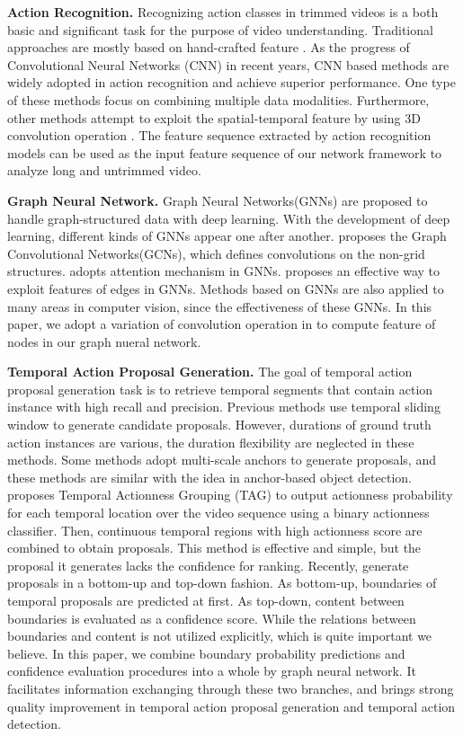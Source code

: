 \documentclass[runningheads]{llncs}
\begin{document}
\noindent\textbf{Action Recognition.}
Recognizing action classes in trimmed videos is a both basic and significant task for the purpose of video understanding. Traditional approaches are mostly based on hand-crafted feature \cite{one,two,three,four}. As the progress of Convolutional Neural Networks (CNN) in recent years, CNN based methods are widely adopted in action recognition and achieve superior performance. One type of these methods \cite{five,six} focus on combining multiple data modalities. Furthermore, other methods attempt to exploit the spatial-temporal feature by using 3D convolution operation \cite{eight,nine,ten}. The feature sequence extracted by action recognition models can be used as the input feature sequence of our network framework to analyze long and untrimmed video.

\noindent\textbf{Graph Neural Network.} Graph Neural Networks(GNNs) are proposed to handle graph-structured data with deep learning. With the development of deep learning, different kinds of GNNs appear one after another. \cite{Kipf_GCN} proposes the Graph Convolutional Networks(GCNs), which defines convolutions on the non-grid structures. \cite{GAT} adopts attention mechanism in GNNs. \cite{EGGN} proposes an effective way to exploit features of edges in GNNs.  Methods\cite{visual_GNNs_1,visual_GNNs_2,visual_GNNs_3} based on GNNs are also applied to many areas in computer vision, since the effectiveness of these GNNs. In this paper, we adopt a variation of convolution operation in \cite{EGGN} to compute feature of nodes in our graph nueral network.

\noindent\textbf{Temporal Action Proposal Generation.}
The goal of temporal action proposal generation task is to retrieve temporal segments that contain action instance with high recall and precision. Previous methods \cite{wang2014action,oneata2014lear} use temporal sliding window to generate candidate proposals. However, durations of ground truth action instances are various, the duration flexibility are neglected in these methods. Some methods  \cite{SST,sw2,sw3,SSAD} adopt multi-scale anchors to generate proposals, and these methods are similar with the idea in anchor-based object detection. \cite{TAG} proposes Temporal Actionness Grouping (TAG) to output actionness probability for each temporal location over the video sequence using a binary actionness classifier. Then, continuous temporal regions with high actionness score are combined to obtain proposals. This method is effective and simple, but the proposal it generates lacks the confidence for ranking. Recently, \cite{BSN,BMN} generate proposals in a bottom-up and top-down fashion. As bottom-up, boundaries of temporal proposals are predicted at first. As top-down, content between boundaries is evaluated as a confidence score. While the relations between boundaries and content is not utilized explicitly, which is quite important we believe. In this paper, we combine boundary probability predictions and confidence evaluation procedures into a whole by graph neural network. It facilitates information exchanging through these two branches, and brings strong quality improvement in temporal action proposal generation and temporal action detection.
\end{document}
